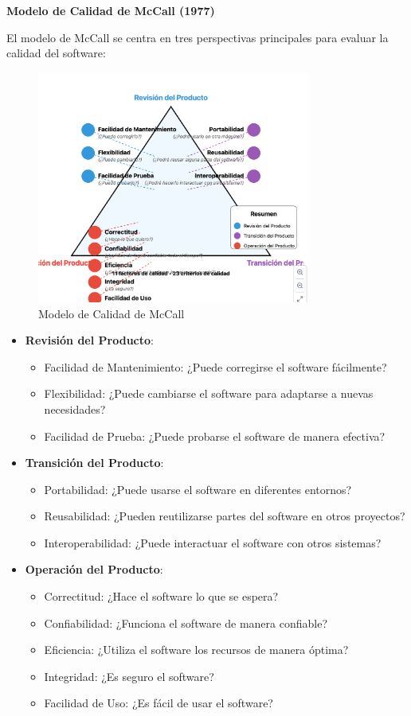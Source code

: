 \textbf{Modelo de Calidad de McCall (1977)}

El modelo de McCall se centra en tres perspectivas principales para evaluar la calidad del software:
\begin{figure}[H]
    \centering
    \includegraphics[width=0.8\textwidth]{Pictures/mccall.png}
    \caption{Modelo de Calidad de McCall}
    \label{fig:mccall}
\end{figure}

\begin{itemize}
    \item \textbf{Revisión del Producto}:
    \begin{itemize}
        \item Facilidad de Mantenimiento: ¿Puede corregirse el software fácilmente?
        \item Flexibilidad: ¿Puede cambiarse el software para adaptarse a nuevas necesidades?
        \item Facilidad de Prueba: ¿Puede probarse el software de manera efectiva?
    \end{itemize}
    \item \textbf{Transición del Producto}:
    \begin{itemize}
        \item Portabilidad: ¿Puede usarse el software en diferentes entornos?
        \item Reusabilidad: ¿Pueden reutilizarse partes del software en otros proyectos?
        \item Interoperabilidad: ¿Puede interactuar el software con otros sistemas?
    \end{itemize}
    \item \textbf{Operación del Producto}:
    \begin{itemize}
        \item Correctitud: ¿Hace el software lo que se espera?
        \item Confiabilidad: ¿Funciona el software de manera confiable?
        \item Eficiencia: ¿Utiliza el software los recursos de manera óptima?
        \item Integridad: ¿Es seguro el software?
        \item Facilidad de Uso: ¿Es fácil de usar el software?
    \end{itemize}
\end{itemize}

